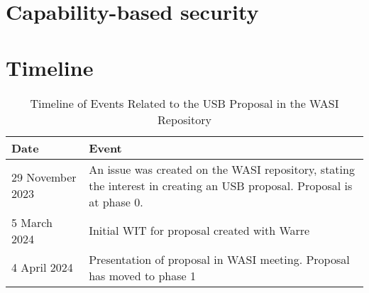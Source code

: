 \section{Capability-based security}

\section{Timeline}

\begin{table}[h]
	\centering
	\begin{tabular}{l|p{12cm}}
		\toprule
		\textbf{Date} & \textbf{Event} \\
		\midrule
		29 November 2023 & An issue \cite{wasi_issue_570} was created on the WASI repository, stating the interest in creating an USB proposal. Proposal is at phase 0. \\
		5 March 2024 & Initial WIT for proposal created with Warre \\
		4 April 2024 & Presentation \cite{wasi_meeting_notes} of proposal in WASI meeting. Proposal has moved to phase 1 \\
		\bottomrule
	\end{tabular}
	\caption{Timeline of Events Related to the USB Proposal in the WASI Repository}
	\label{tab:wasi_usb_proposal}
\end{table}
